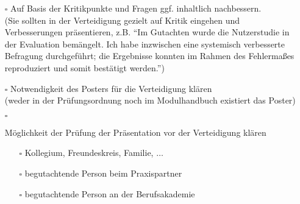 \begin{itemize}
{\begin{itemize}
{                \begin{itemize}
                    \item[$\square$] Gutachten Praxispartner
                    \item[$\square$] Gutachten Berufsakademie
                \end{itemize}
            }
            \item[$\square$]{
                Auf Basis der Kritikpunkte und Fragen ggf. inhaltlich nachbessern.\\
                (Sie sollten in der Verteidigung gezielt auf Kritik eingehen und Verbesserungen präsentieren, z.B. \enquote{Im Gutachten wurde die Nutzerstudie in der Evaluation bemängelt. Ich habe inzwischen eine systemisch verbesserte Befragung durchgeführt; die Ergebnisse konnten im Rahmen des Fehlermaßes reproduziert und somit bestätigt werden.})
            }         
            \item[$\square$]{
                Notwendigkeit des Posters für die Verteidigung klären\\
                (weder in der Prüfungsordnung noch im Modulhandbuch existiert das Poster)
            }
            \item[$\square$]{
                Möglichkeit der Prüfung der Präsentation vor der Verteidigung klären
                \begin{itemize}
                    \item[$\square$] Kollegium, Freundeskreis, Familie, $\ldots$
                    \item[$\square$] begutachtende Person beim Praxispartner
                    \item[$\square$] begutachtende Person an der Berufsakademie
                \end{itemize}
            }
        \end{itemize}
    }
\end{itemize}